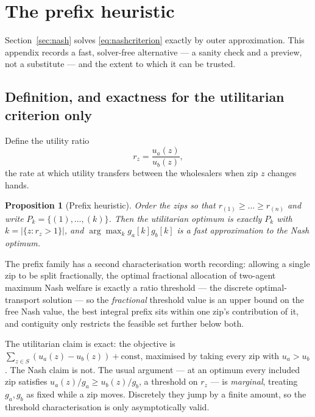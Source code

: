 \documentclass[11pt]{article}
\newtheorem{proposition}{Proposition}
\theoremstyle{remark}\newtheorem*{remark}{Remark}
\begin{document}
\section{The prefix heuristic}\label{app:prefix}
Section~\ref{sec:nash} solves \eqref{eq:nashcriterion} exactly by outer approximation.
This appendix records a fast, solver-free alternative --- a sanity check and a preview,
not a substitute --- and the extent to which it can be trusted.

\subsection{Definition, and exactness for the utilitarian criterion only}
Define the utility ratio
\begin{equation}
r_z=\frac{u_a(z)}{u_b(z)},
\end{equation}
the rate at which utility transfers between the wholesalers when zip $z$ changes hands.

\begin{resultbox}
\begin{proposition}[Prefix heuristic]\label{prop:prefix}
Order the zips so that $r_{(1)}\ge\dots\ge r_{(n)}$ and write $P_k=\{(1),\dots,(k)\}$.
Then the utilitarian optimum is exactly $P_k$ with $k=|\{z:r_z>1\}|$, and
$\arg\max_k g_a[k]g_b[k]$ is a fast approximation to the Nash optimum.
\end{proposition}
\end{resultbox}

\noindent The prefix family has a second characterisation worth recording: allowing a
single zip to be split fractionally, the optimal fractional allocation of two-agent
maximum Nash welfare is exactly a ratio threshold --- the discrete optimal-transport
solution --- so the \emph{fractional} threshold value is an upper bound on the free
Nash value, the best integral prefix sits within one zip's contribution of it, and
contiguity only restricts the feasible set further below both.

\noindent The utilitarian claim is exact: the objective is
$\sum_{z\in S}(u_a(z)-u_b(z))+\text{const}$, maximised by taking every zip with
$u_a>u_b$. The Nash claim is not. The usual argument --- at an optimum every included
zip satisfies $u_a(z)/g_a\ge u_b(z)/g_b$, a threshold on $r_z$ --- is \emph{marginal},
treating $g_a,g_b$ as fixed while a zip moves. Discretely they jump by a finite amount,
so the threshold characterisation is only asymptotically valid.
\end{document}

